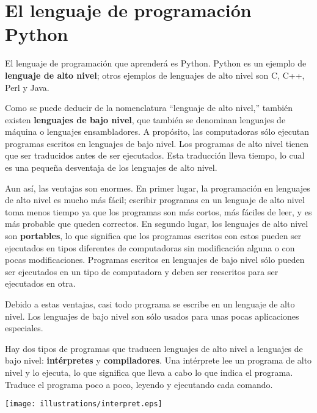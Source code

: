\section{El lenguaje de programación Python}

El lenguaje de programación que aprenderá es Python. Python es un
ejemplo de {\bf lenguaje de alto nivel}; otros ejemplos de
lenguajes de alto nivel son C, C++, Perl y Java.

Como se puede deducir de la nomenclatura ``lenguaje de alto
nivel,'' también existen {\bf lenguajes de bajo nivel}, que
también se denominan lenguajes de máquina o lenguajes ensambladores. 
A propósito, las computadoras sólo ejecutan programas escritos en lenguajes de bajo nivel. Los programas de alto nivel
tienen que ser traducidos antes de ser ejecutados. Esta traducción
lleva tiempo, lo cual es una pequeña desventaja de los lenguajes
de alto nivel.


Aun así, las ventajas son enormes. En primer lugar, la programación
en lenguajes de alto nivel es mucho más fácil; escribir programas
en un lenguaje de alto nivel toma menos tiempo ya que los programas son
más cortos, más fáciles de leer, y es más probable que  queden correctos. 
En segundo lugar, los lenguajes de alto
nivel son {\bf portables}, lo que significa que los programas
escritos con estos pueden ser
ejecutados en tipos diferentes de computadoras sin modificación
alguna o con pocas modificaciones. Programas escritos en lenguajes
de bajo nivel sólo pueden ser ejecutados en un tipo de computadora
y deben ser reescritos para ser ejecutados en otra.

Debido a estas ventajas, casi todo programa se escribe en un
lenguaje de alto nivel. Los lenguajes de bajo nivel son sólo usados
para unas pocas aplicaciones especiales.


Hay dos tipos de programas que traducen lenguajes de alto nivel a
lenguajes de bajo nivel: {\bf intérpretes} y {\bf
compiladores}. Una intérprete lee un programa de alto nivel y lo
ejecuta, lo que significa que lleva a cabo lo que indica el
programa. Traduce el programa poco a poco, leyendo y ejecutando
cada comando.

\vspace{0.1in}
\centerline{\texttt{[image: illustrations/interpret.eps]}}
\vspace{0.1in}

